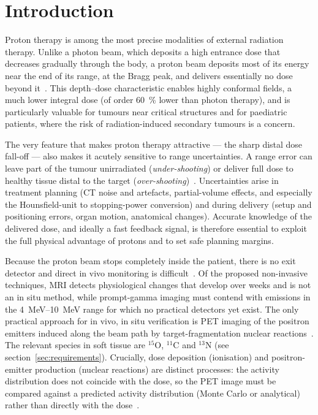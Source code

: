 \documentclass{iopjournal}
\begin{document}
\section{Introduction}
\label{sec:intro}

Proton therapy is among the most precise modalities of external radiation
therapy. Unlike a photon beam, which deposits a high entrance dose that
decreases gradually through the body, a proton beam deposits most of its
energy near the end of its range, at the Bragg peak, and delivers essentially
no dose beyond it~\cite{paganetti2012range}. This depth--dose characteristic
enables highly conformal fields, a much lower integral dose (of order
\SI{60}{\percent} lower than photon therapy), and is particularly valuable for
tumours near critical structures and for paediatric patients, where the risk
of radiation-induced secondary tumours is a concern.

The very feature that makes proton therapy attractive --- the sharp distal
dose fall-off --- also makes it acutely sensitive to range uncertainties.
A range error can leave part of the tumour unirradiated (\emph{under-shooting})
or deliver full dose to healthy tissue distal to the target
(\emph{over-shooting})~\cite{paganetti2012range}. Uncertainties arise in
treatment planning (CT noise and artefacts, partial-volume effects, and
especially the Hounsfield-unit to stopping-power conversion) and during
delivery (setup and positioning errors, organ motion, anatomical changes).
Accurate knowledge of the delivered dose, and ideally a fast feedback signal,
is therefore essential to exploit the full physical advantage of protons and
to set safe planning margins.

Because the proton beam stops completely inside the patient, there is no exit
detector and direct in vivo monitoring is difficult~\cite{zhu2013proton}.
Of the proposed non-invasive techniques, MRI detects physiological changes
that develop over weeks and is not an in situ method, while prompt-gamma
imaging must contend with emissions in the \SIrange{4}{10}{\MeV} range for
which no practical detectors yet exist. The only practical approach for
in vivo, in situ verification is PET imaging of the positron emitters induced
along the beam path by target-fragmentation nuclear
reactions~\cite{zhu2013proton}. The relevant species in soft tissue are
$^{15}$O, $^{11}$C and $^{13}$N (see section~\ref{sec:requirements}). Crucially,
dose deposition (ionisation) and positron-emitter production (nuclear
reactions) are distinct processes: the activity distribution does
not coincide with the dose, so the PET image must be compared against a
predicted activity distribution (Monte Carlo or analytical) rather than
directly with the dose~\cite{zhu2013proton}.
\end{document}
